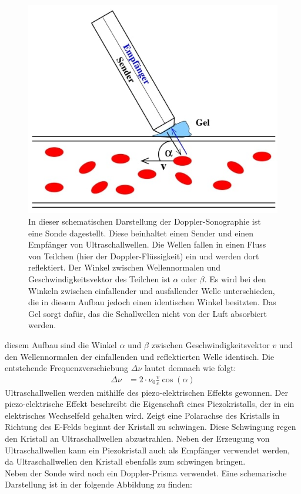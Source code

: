 \begin{figure}[H]
    \centering
    \includegraphics[width=0.5\linewidth]{images/Schema.jpg}
    \caption{In dieser schematischen Darstellung der Doppler-Sonographie \cite{V903} ist eine Sonde dagestellt. Diese beinhaltet einen Sender und einen Empfänger von Ultraschallwellen.
    Die Wellen fallen in einen Fluss von Teilchen (hier der Doppler-Flüssigkeit) ein und werden dort reflektiert. Der Winkel zwischen Wellennormalen und Geschwindigkeitsvektor des Teilchen ist $\alpha$
    oder $\beta$. Es wird bei den Winkeln zwischen einfallender und ausfallender Welle unterschieden, die in diesem Aufbau jedoch einen identischen Winkel besitzten. Das Gel sorgt dafür,
    das die Schallwellen nicht von der Luft absorbiert werden.}
    \label{fig:1}
\end{figure}

    \justifying diesem Aufbau sind die Winkel $\alpha$ und $\beta$ zwischen Geschwindigkeitsvektor $v$ und den Wellennormalen der einfallenden und reflektierten Welle identisch. Die 
    entstehende Frequenzverschiebung $\Delta\nu$ lautet demnach wie folgt:
    \begin{align}
        \Delta\nu &= 2\cdot \nu_0 \frac{v}{c} \cos(\alpha) \label{eq:3}
    \end{align} 
    \justifying Ultraschallwellen werden mithilfe des piezo-elektrischen Effekts gewonnen. Der piezo-elektrische Effekt beschreibt die Eigenschaft eines Piezokristalls,
    der in ein elektrisches Wechselfeld gehalten wird. Zeigt eine Polarachse des Kristalls in Richtung des E-Felds beginnt der Kristall zu schwingen. Diese Schwingung regen den Kristall an
    Ultraschallwellen abzustrahlen.
    Neben der Erzeugung von Ultraschallwellen kann ein Piezokristall auch als Empfänger verwendet werden, da Ultraschallwellen den Kristall ebenfalls zum schwingen bringen.\\
    Neben der Sonde wird noch ein Doppler-Prisma verwendet. Eine schemarische Darstellung ist in der folgende Abbildung zu finden:

